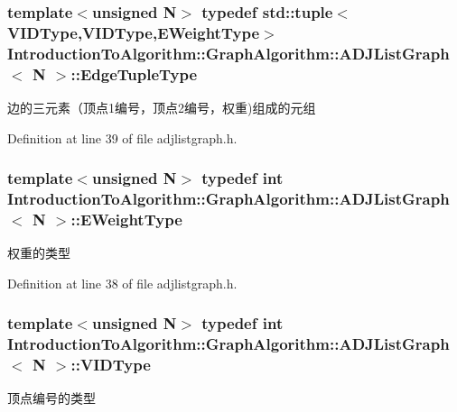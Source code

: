 \subsubsection[{Edge\+Tuple\+Type}]{\setlength{\rightskip}{0pt plus 5cm}template$<$unsigned N$>$ typedef std\+::tuple$<${\bf V\+I\+D\+Type},{\bf V\+I\+D\+Type},{\bf E\+Weight\+Type}$>$ {\bf Introduction\+To\+Algorithm\+::\+Graph\+Algorithm\+::\+A\+D\+J\+List\+Graph}$<$ N $>$\+::{\bf Edge\+Tuple\+Type}}\label{struct_introduction_to_algorithm_1_1_graph_algorithm_1_1_a_d_j_list_graph_a6757574602df8359b10e37079c789eb6}
边的三元素（顶点1编号，顶点2编号，权重)组成的元组 

Definition at line 39 of file adjlistgraph.\+h.

\hypertarget{struct_introduction_to_algorithm_1_1_graph_algorithm_1_1_a_d_j_list_graph_a8b9518587536b482cfd8c2fc7f5c9678}{}
\subsubsection[{E\+Weight\+Type}]{\setlength{\rightskip}{0pt plus 5cm}template$<$unsigned N$>$ typedef int {\bf Introduction\+To\+Algorithm\+::\+Graph\+Algorithm\+::\+A\+D\+J\+List\+Graph}$<$ N $>$\+::{\bf E\+Weight\+Type}}\label{struct_introduction_to_algorithm_1_1_graph_algorithm_1_1_a_d_j_list_graph_a8b9518587536b482cfd8c2fc7f5c9678}
权重的类型 

Definition at line 38 of file adjlistgraph.\+h.

\hypertarget{struct_introduction_to_algorithm_1_1_graph_algorithm_1_1_a_d_j_list_graph_aa42303d15a6a0e4cf6fad5c1327c1d79}{}
\subsubsection[{V\+I\+D\+Type}]{\setlength{\rightskip}{0pt plus 5cm}template$<$unsigned N$>$ typedef int {\bf Introduction\+To\+Algorithm\+::\+Graph\+Algorithm\+::\+A\+D\+J\+List\+Graph}$<$ N $>$\+::{\bf V\+I\+D\+Type}}\label{struct_introduction_to_algorithm_1_1_graph_algorithm_1_1_a_d_j_list_graph_aa42303d15a6a0e4cf6fad5c1327c1d79}
顶点编号的类型 

